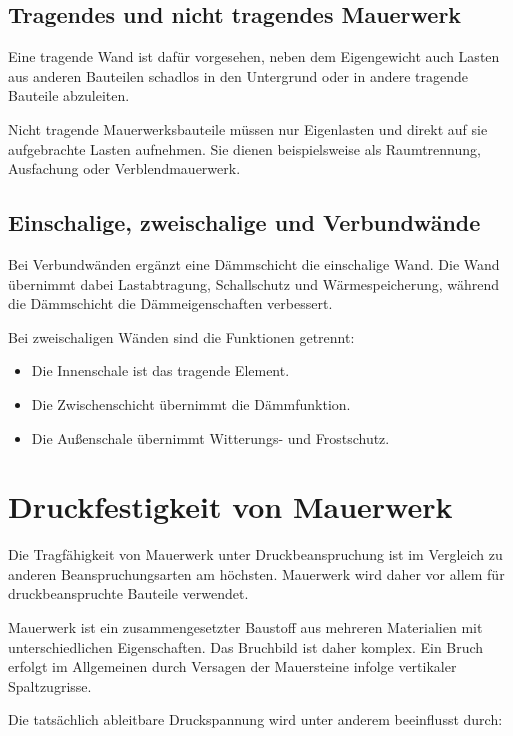\documentclass[
  12pt,
  a4paper,
  oneside
]{scrreprt}
\begin{document}
\subsection{Tragendes und nicht tragendes Mauerwerk}

Eine tragende Wand ist dafür vorgesehen, neben dem Eigengewicht auch
Lasten aus anderen Bauteilen schadlos in den Untergrund oder in andere
tragende Bauteile abzuleiten.


Nicht tragende Mauerwerksbauteile müssen nur Eigenlasten und direkt auf
sie aufgebrachte Lasten aufnehmen. Sie dienen beispielsweise als
Raumtrennung, Ausfachung oder Verblendmauerwerk.


\subsection{Einschalige, zweischalige und Verbundwände}

Bei Verbundwänden ergänzt eine Dämmschicht die einschalige Wand. Die
Wand übernimmt dabei Lastabtragung, Schallschutz und Wärmespeicherung,
während die Dämmschicht die Dämmeigenschaften verbessert.


Bei zweischaligen Wänden sind die Funktionen getrennt:

\begin{itemize}
  \item Die Innenschale ist das tragende Element.
  \item Die Zwischenschicht übernimmt die Dämmfunktion.
  \item Die Außenschale übernimmt Witterungs- und Frostschutz.
\end{itemize}



\section{Druckfestigkeit von Mauerwerk}

Die Tragfähigkeit von Mauerwerk unter Druckbeanspruchung ist im
Vergleich zu anderen Beanspruchungsarten am höchsten. Mauerwerk wird
daher vor allem für druckbeanspruchte Bauteile verwendet.


Mauerwerk ist ein zusammengesetzter Baustoff aus mehreren Materialien
mit unterschiedlichen Eigenschaften. Das Bruchbild ist daher komplex.
Ein Bruch erfolgt im Allgemeinen durch Versagen der Mauersteine infolge
vertikaler Spaltzugrisse.


Die tatsächlich ableitbare Druckspannung wird unter anderem beeinflusst
durch:
\end{document}

